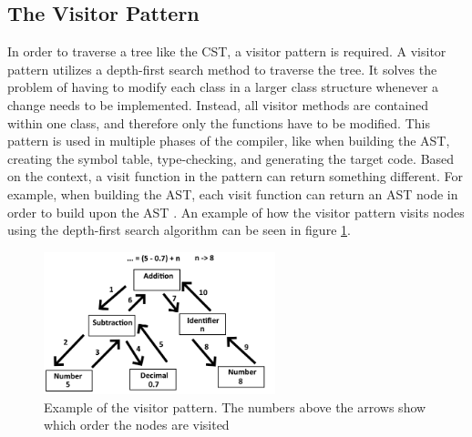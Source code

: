 \subsection{The Visitor Pattern}
\label{lab:visitorPattern}
In order to traverse a tree like the CST, a visitor pattern is required. A visitor pattern utilizes a depth-first search method to traverse the tree. It solves the problem of having to modify each class in a larger class structure whenever a change needs to be implemented. Instead, all visitor methods are contained within one class, and therefore only the functions have to be modified. This pattern is used in multiple phases of the \lang compiler, like when building the AST, creating the symbol table, type-checking, and generating the target code. Based on the context, a visit function in the pattern can return something different. For example, when building the AST, each visit function can return an AST node in order to build upon the AST \cite{VisitorWIKI}. An example of how the visitor pattern visits nodes using the depth-first search algorithm can be seen in figure \ref{fig:VisitorPattern_Example}.

\begin{figure}[H] 
    \begin{center}
        \includegraphics[width=0.6\textwidth]{Files/Billeder: Impl/VisitorpatternExample.png}
    \end{center}
    \caption{Example of the visitor pattern. The numbers above the arrows show which order the nodes are visited}
    \label{fig:VisitorPattern_Example}
\end{figure}

